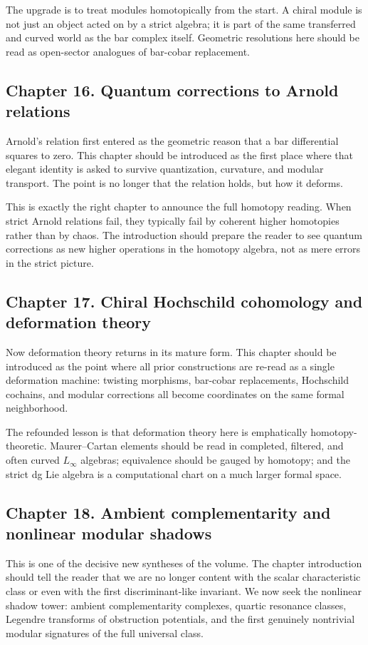 The upgrade is to treat modules homotopically from the start.  A chiral module is not just an object acted on by a strict algebra; it is part of the same transferred and curved world as the bar complex itself.  Geometric resolutions here should be read as open-sector analogues of bar-cobar replacement.

\subsection*{Chapter 16. Quantum corrections to Arnold relations}
Arnold's relation first entered as the geometric reason that a bar differential squares to zero.  This chapter should be introduced as the first place where that elegant identity is asked to survive quantization, curvature, and modular transport.  The point is no longer that the relation holds, but how it deforms.

This is exactly the right chapter to announce the full homotopy reading.  When strict Arnold relations fail, they typically fail by coherent higher homotopies rather than by chaos.  The introduction should prepare the reader to see quantum corrections as new higher operations in the homotopy algebra, not as mere errors in the strict picture.

\subsection*{Chapter 17. Chiral Hochschild cohomology and deformation theory}
Now deformation theory returns in its mature form.  This chapter should be introduced as the point where all prior constructions are re-read as a single deformation machine: twisting morphisms, bar-cobar replacements, Hochschild cochains, and modular corrections all become coordinates on the same formal neighborhood.

The refounded lesson is that deformation theory here is emphatically homotopy-theoretic.  Maurer--Cartan elements should be read in completed, filtered, and often curved $L_\infty$ algebras; equivalence should be gauged by homotopy; and the strict dg Lie algebra is a computational chart on a much larger formal space.

\subsection*{Chapter 18. Ambient complementarity and nonlinear modular shadows}
This is one of the decisive new syntheses of the volume.  The chapter introduction should tell the reader that we are no longer content with the scalar characteristic class or even with the first discriminant-like invariant.  We now seek the nonlinear shadow tower: ambient complementarity complexes, quartic resonance classes, Legendre transforms of obstruction potentials, and the first genuinely nontrivial modular signatures of the full universal class.

